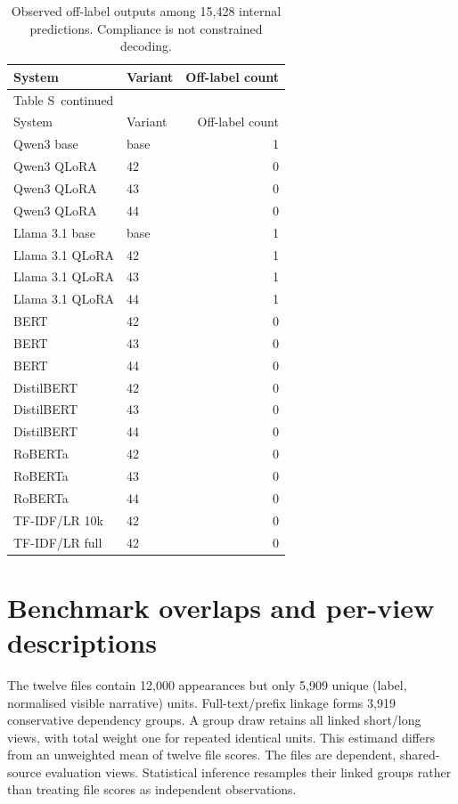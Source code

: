 \documentclass[10pt,a4paper]{article}
\renewcommand{\thetable}{S\arabic{table}}
\begin{document}
{\small
\setlength{\tabcolsep}{4pt}
\begin{longtable}{@{}llr@{}}
\caption{Observed off-label outputs among 15,428 internal predictions. Compliance is not constrained decoding.}\label{sup:off-label}\\
\toprule
System & Variant & Off-label count \\
\midrule\endfirsthead
\multicolumn{3}{l}{\small Table \thetable\ continued}\\
\toprule
System & Variant & Off-label count \\
\midrule\endhead
\bottomrule\endfoot
Qwen3 base & base & 1 \\
Qwen3 QLoRA & 42 & 0 \\
Qwen3 QLoRA & 43 & 0 \\
Qwen3 QLoRA & 44 & 0 \\
Llama 3.1 base & base & 1 \\
Llama 3.1 QLoRA & 42 & 1 \\
Llama 3.1 QLoRA & 43 & 1 \\
Llama 3.1 QLoRA & 44 & 1 \\
BERT & 42 & 0 \\
BERT & 43 & 0 \\
BERT & 44 & 0 \\
DistilBERT & 42 & 0 \\
DistilBERT & 43 & 0 \\
DistilBERT & 44 & 0 \\
RoBERTa & 42 & 0 \\
RoBERTa & 43 & 0 \\
RoBERTa & 44 & 0 \\
TF-IDF/LR 10k & 42 & 0 \\
TF-IDF/LR full & 42 & 0 \\
\end{longtable}
}


\section{Benchmark overlaps and per-view descriptions}\label{sup:legacy}


The twelve files contain 12,000 appearances but only 5,909 unique (label, normalised visible narrative) units. Full-text/prefix linkage forms 3,919 conservative dependency groups. A group draw retains all linked short/long views, with total weight one for repeated identical units. This estimand differs from an unweighted mean of twelve file scores. The files are dependent, shared-source evaluation views. Statistical inference resamples their linked groups rather than treating file scores as independent observations.
\end{document}
